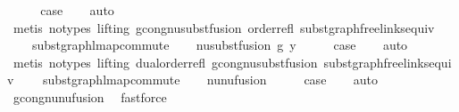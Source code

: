 \begin{isabellebody}
\ \ \isamarkupfalse%
\ \isamarkupfalse%
\ {\isacharquery}{\kern0pt}case\isanewline
\ \ \isamarkupfalse%
\ auto\isanewline
\ \ \isamarkupfalse%
\ {\isacharparenleft}{\kern0pt}metis\ {\isacharparenleft}{\kern0pt}no{\isacharunderscore}{\kern0pt}types{\isacharcomma}{\kern0pt}\ lifting{\isacharparenright}{\kern0pt}\ gcong{\isachardot}{\kern0pt}nu{\isacharunderscore}{\kern0pt}subst{\isacharunderscore}{\kern0pt}fusion{}\ order{\isacharunderscore}{\kern0pt}refl\ subst{\isacharunderscore}{\kern0pt}graph{\isacharunderscore}{\kern0pt}freelinks{\isacharunderscore}{\kern0pt}equiv\isanewline
\ \ \ \ subst{\isacharunderscore}{\kern0pt}graph{\isacharunderscore}{\kern0pt}lmap{\isacharunderscore}{\kern0pt}commute{\isacharparenright}{\kern0pt}\isanewline
{}\isamarkupfalse%
\isanewline
\ \ \isamarkupfalse%
\ {\isacharparenleft}{\kern0pt}nu{\isacharunderscore}{\kern0pt}subst{\isacharunderscore}{\kern0pt}fusion{}\ g\ y{\isacharparenright}{\kern0pt}\isanewline
\ \ \isamarkupfalse%
\ \isamarkupfalse%
\ {\isacharquery}{\kern0pt}case\isanewline
\ \ \isamarkupfalse%
\ auto\isanewline
\ \ \isamarkupfalse%
\ {\isacharparenleft}{\kern0pt}metis\ {\isacharparenleft}{\kern0pt}no{\isacharunderscore}{\kern0pt}types{\isacharcomma}{\kern0pt}\ lifting{\isacharparenright}{\kern0pt}\ dual{\isacharunderscore}{\kern0pt}order{\isachardot}{\kern0pt}refl\ gcong{\isachardot}{\kern0pt}nu{\isacharunderscore}{\kern0pt}subst{\isacharunderscore}{\kern0pt}fusion{}\ subst{\isacharunderscore}{\kern0pt}graph{\isacharunderscore}{\kern0pt}freelinks{\isacharunderscore}{\kern0pt}equiv\isanewline
\ \ \ \ subst{\isacharunderscore}{\kern0pt}graph{\isacharunderscore}{\kern0pt}lmap{\isacharunderscore}{\kern0pt}commute{\isacharparenright}{\kern0pt}\isanewline
{}\isamarkupfalse%
\isanewline
\ \ \isamarkupfalse%
\ nu{\isacharunderscore}{\kern0pt}nu{\isacharunderscore}{\kern0pt}fusion{}\isanewline
\ \ \isamarkupfalse%
\ \isamarkupfalse%
\ {\isacharquery}{\kern0pt}case\isanewline
\ \ \isamarkupfalse%
\ auto\isanewline
\ \ \isamarkupfalse%
\ gcong{\isachardot}{\kern0pt}nu{\isacharunderscore}{\kern0pt}nu{\isacharunderscore}{\kern0pt}fusion{}\ \isamarkupfalse%
\ fastforce\isanewline
{}\isamarkupfalse%
\isanewline

\end{isabellebody}
